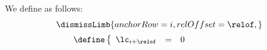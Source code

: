 We define \dismissLimbName{} as follows:
\[
	\begin{array}{l}
		\dismissLimb {
			anchorRow = i      ,
			relOffset = \relof ,
		}
		\vspace{2mm} \\
		\qquad \define
		\left\{ \begin{array}{lcl}
			\lc _{i + \relof} & = & 0 \\
		\end{array} \right.
	\end{array}
\]
